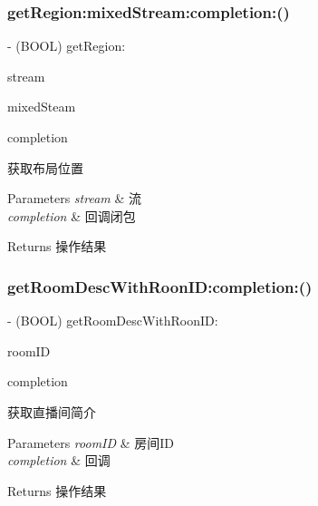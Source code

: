 \subsubsection{\texorpdfstring{get\+Region\+:mixed\+Stream\+:completion\+:()}{getRegion:mixedStream:completion:()}}
{\footnotesize\ttfamily -\/ (B\+O\+OL) get\+Region\+: \begin{DoxyParamCaption}\item[{(\hyperlink{interface_c_c_stream}{C\+C\+Stream} $\ast$)}]{stream }\item[{mixedStream:(\hyperlink{interface_c_c_stream}{C\+C\+Stream} $\ast$)}]{mixed\+Steam }\item[{completion:(C\+C\+Comletion\+Block)}]{completion }\end{DoxyParamCaption}}

获取布局位置 
\begin{DoxyParams}{Parameters}
{\em stream} & 流 \\
\hline
{\em completion} & 回调闭包 \\
\hline
\end{DoxyParams}
\begin{DoxyReturn}{Returns}
操作结果 
\end{DoxyReturn}
\mbox{\label{interface_c_c_streamer_basic_a566714939c10eebc3def763308ad2e41}} 
\subsubsection{\texorpdfstring{get\+Room\+Desc\+With\+Roon\+I\+D\+:completion\+:()}{getRoomDescWithRoonID:completion:()}}
{\footnotesize\ttfamily -\/ (B\+O\+OL) get\+Room\+Desc\+With\+Roon\+I\+D\+: \begin{DoxyParamCaption}\item[{(N\+S\+String $\ast$)}]{room\+ID }\item[{completion:(C\+C\+Comletion\+Block)}]{completion }\end{DoxyParamCaption}}

获取直播间简介 
\begin{DoxyParams}{Parameters}
{\em room\+ID} & 房间\+ID \\
\hline
{\em completion} & 回调 \\
\hline
\end{DoxyParams}
\begin{DoxyReturn}{Returns}
操作结果 
\end{DoxyReturn}
\mbox{\label{interface_c_c_streamer_basic_a3d9a24ed847067f8f71c815d5ce6c60e}} 
